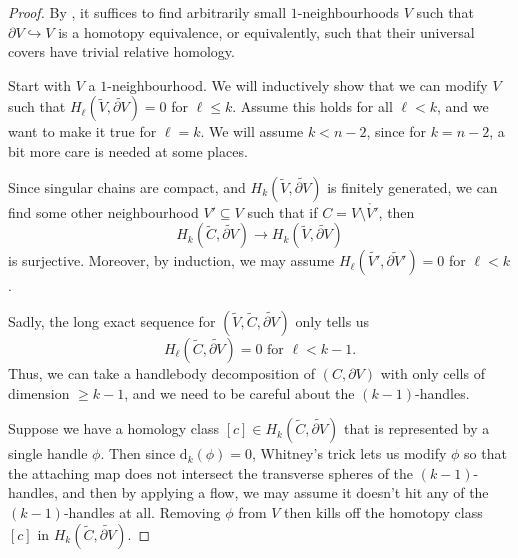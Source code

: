 \documentclass[a4paper, 12pt]{article}
\theoremstyle{definition}
\renewcommand\d{\mathrm{d}}
\begin{document}

\begin{proof}
  By , it suffices to find arbitrarily small $1$-neighbourhoods $V$ such that $\partial V \hookrightarrow V$ is a homotopy equivalence, or equivalently, such that their universal covers have trivial relative homology.

  Start with $V$ a $1$-neighbourhood. We will inductively show that we can modify $V$ such that $H_\ell(\tilde{V}, \widetilde{\partial V}) = 0$ for $\ell \leq k$. Assume this holds for all $\ell < k$, and we want to make it true for $\ell = k$. We will assume $k < n - 2$, since for $k = n - 2$, a bit more care is needed at some places.

  Since singular chains are compact, and $H_k(\tilde{V}, \widetilde{\partial V})$ is finitely generated, we can find some other neighbourhood $V' \subseteq V$ such that if $C = V \setminus \mathring{V'}$, then
  \[
    H_k(\tilde{C}, \widetilde{\partial V}) \to H_k(\tilde{V}, \widetilde{\partial V})
  \]
  is surjective. Moreover, by induction, we may assume $H_\ell(\tilde{V'}, \widetilde{\partial V'}) = 0$ for $\ell < k$.

  Sadly, the long exact sequence for $(\tilde{V}, \tilde{C}, \widetilde{\partial V})$ only tells us
  \[
    H_\ell(\tilde{C}, \widetilde{\partial V}) = 0\text{ for }\ell < k - 1.
  \]
  Thus, we can take a handlebody decomposition of $(C, \partial V)$ with only cells of dimension $\geq k - 1$, and we need to be careful about the $(k - 1)$-handles.

  Suppose we have a homology class $[c] \in H_k(\tilde{C}, \widetilde{\partial V})$ that is represented by a single handle $\phi$. Then since $\d_k (\phi) = 0$, Whitney's trick lets us modify $\phi$ so that the attaching map does not intersect the transverse spheres of the $(k-1)$-handles, and then by applying a flow, we may assume it doesn't hit any of the $(k - 1)$-handles at all. Removing $\phi$ from $V$ then kills off the homotopy class $[c]$ in $H_k(\tilde{C}, \widetilde{\partial V})$.


\end{proof}
\end{document}
